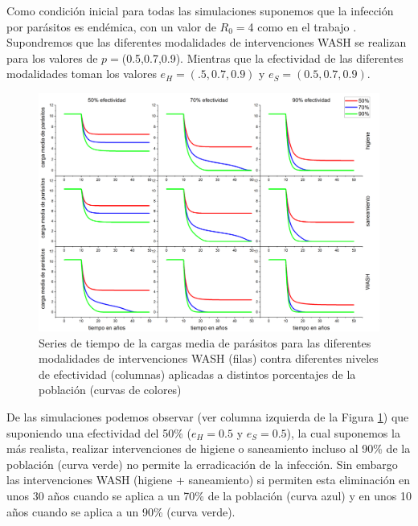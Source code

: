 \documentclass[12pt,a4paper]{article}
\theoremstyle{plain}%
\theoremstyle{definition}
\theoremstyle{remark}
\begin{document}
	Como condición inicial para todas las simulaciones suponemos que la infección por parásitos es endémica, con un valor de $R_0=$4  como en el trabajo \cite{croll1982population}. 
	Supondremos que las diferentes modalidades de intervenciones WASH 
	se realizan para los valores de $p=$(0.5,0.7,0.9). Mientras que la efectividad de las diferentes modalidades
	toman los valores $e_H=(.5,0.7,0.9)$ y $e_S=(0.5,0.7,0.9)$.
	\begin{figure}[h!]
		\centering
		\includegraphics[width=.99\linewidth]{fig1}
		\caption{Series de tiempo de la cargas media de parásitos para las diferentes modalidades de intervenciones WASH (filas) contra diferentes niveles de efectividad (columnas) aplicadas a distintos porcentajes de la población (curvas de colores)}
		\label{fig:model1conjunto}
	\end{figure}

	De las simulaciones podemos observar (ver columna izquierda de la Figura \ref{fig:model1conjunto}) 
	que suponiendo una efectividad del 50\% ($e_H=0.5$ y $e_S=0.5$), la cual suponemos la más realista, realizar intervenciones de higiene o saneamiento incluso al 90\% de la población (curva verde) no permite la erradicación de la infección. Sin embargo las intervenciones WASH (higiene + saneamiento) si permiten esta eliminación en unos 30 años cuando se aplica a un 70\% de la población (curva azul) y en unos 10 años cuando se aplica a un 90\% (curva verde). 
	
\end{document}
